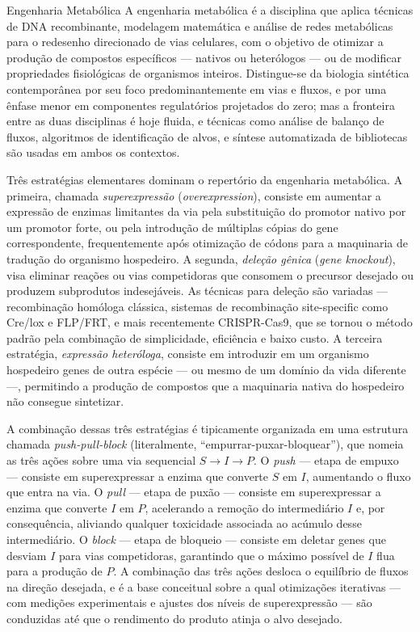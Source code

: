 \begin{definicao}{Engenharia Metabólica}
A engenharia metabólica é a disciplina que aplica técnicas de DNA recombinante, modelagem matemática e análise de redes metabólicas para o redesenho direcionado de vias celulares, com o objetivo de otimizar a produção de compostos específicos --- nativos ou heterólogos --- ou de modificar propriedades fisiológicas de organismos inteiros. Distingue-se da biologia sintética contemporânea por seu foco predominantemente em vias e fluxos, e por uma ênfase menor em componentes regulatórios projetados do zero; mas a fronteira entre as duas disciplinas é hoje fluida, e técnicas como análise de balanço de fluxos, algoritmos de identificação de alvos, e síntese automatizada de bibliotecas são usadas em ambos os contextos.
\end{definicao}

Três estratégias elementares dominam o repertório da engenharia metabólica. A primeira, chamada \emph{superexpressão} (\emph{overexpression}), consiste em aumentar a expressão de enzimas limitantes da via pela substituição do promotor nativo por um promotor forte, ou pela introdução de múltiplas cópias do gene correspondente, frequentemente após otimização de códons para a maquinaria de tradução do organismo hospedeiro. A segunda, \emph{deleção gênica} (\emph{gene knockout}), visa eliminar reações ou vias competidoras que consomem o precursor desejado ou produzem subprodutos indesejáveis. As técnicas para deleção são variadas --- recombinação homóloga clássica, sistemas de recombinação site-specific como Cre/lox e FLP/FRT, e mais recentemente CRISPR-Cas9, que se tornou o método padrão pela combinação de simplicidade, eficiência e baixo custo. A terceira estratégia, \emph{expressão heteróloga}, consiste em introduzir em um organismo hospedeiro genes de outra espécie --- ou mesmo de um domínio da vida diferente ---, permitindo a produção de compostos que a maquinaria nativa do hospedeiro não consegue sintetizar.

A combinação dessas três estratégias é tipicamente organizada em uma estrutura chamada \emph{push-pull-block} (literalmente, ``empurrar-puxar-bloquear''), que nomeia as três ações sobre uma via sequencial $S \rightarrow I \rightarrow P$. O \emph{push} --- etapa de empuxo --- consiste em superexpressar a enzima que converte $S$ em $I$, aumentando o fluxo que entra na via. O \emph{pull} --- etapa de puxão --- consiste em superexpressar a enzima que converte $I$ em $P$, acelerando a remoção do intermediário $I$ e, por consequência, aliviando qualquer toxicidade associada ao acúmulo desse intermediário. O \emph{block} --- etapa de bloqueio --- consiste em deletar genes que desviam $I$ para vias competidoras, garantindo que o máximo possível de $I$ flua para a produção de $P$. A combinação das três ações desloca o equilíbrio de fluxos na direção desejada, e é a base conceitual sobre a qual otimizações iterativas --- com medições experimentais e ajustes dos níveis de superexpressão --- são conduzidas até que o rendimento do produto atinja o alvo desejado.


